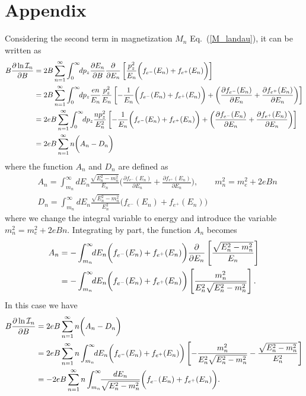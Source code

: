 \documentclass[sn-mathphys,Numbered]{sn-jnl}
\begin{document}
\section{Appendix}
\label{Append}
Considering the second term in magnetization $M_n$ Eq.~(\ref{M_landau}), it can be written as
\begin{align}
B\frac{\partial\ln\mathcal{I}_n}{\partial B}&=2B \sum_{n=1}^\infty\int_0^\infty\!\!dp_z \frac{\partial E_n}{\partial B}\frac{\partial}{\partial E_n}\left[\frac{p_z^2}{E_{n}}\bigg(f_{e^-}(E_n)+f_{e^+}(E_n)\bigg)\right]\notag\\
&=2B \sum_{n=1}^\infty\int_0^\infty\!\!dp_z \frac{en}{E_n}\frac{p_z^2}{E_{n}}\left[-\frac{1}{E_{n}}\bigg(f_{e^-}(E_n)+f_{e^+}(E_n)\bigg)+\bigg(\frac{\partial f_{e^-}(E_n)}{\partial E_n}+\frac{\partial f_{e^+}(E_n)}{\partial E_n}\bigg)\right]\notag\\
&=2eB \sum_{n=1}^\infty\int_0^\infty\!\!dp_z \frac{n p_z^2}{E^2_{n}}\left[-\frac{1}{E_{n}}\bigg(f_{e^-}(E_n)+f_{e^+}(E_n)\bigg)+\bigg(\frac{\partial f_{e^-}(E_n)}{\partial E_n}+\frac{\partial f_{e^+}(E_n)}{\partial E_n}\bigg)\right]\notag\\
&=2eB\sum_{n=1}^\infty n\bigg(A_n-D_n\bigg)
\end{align}
where the function $A_n$ and $D_n$ are defined as
\begin{align}
\label{Function_A}
&A_n=\int_{m_n}^\infty\!\!dE_n \frac{\sqrt{E^2_n-m^2_n}}{E_{n}}\bigg(\frac{\partial f_{e^-}(E_n)}{\partial E_n}+\frac{\partial f_{e^+}(E_n)}{\partial E_n}\bigg),\qquad m_n^2=m^2_e+2eBn\\ 
\label{Function_D}
&D_n=\int_{m_n}^\infty\!\!dE_n \frac{\sqrt{E^2_n-m^2_n}}{E^2_{n}}\bigg(f_{e^-}(E_n)+f_{e^+}(E_n)\bigg)
\end{align}
where we change the integral variable to energy and introduce the variable $m_n^2=m^2_e+2eBn$. Integrating by part, the function $A_n$ becomes
\begin{align}
A_n&=-\int_{m_n}^\infty\!\!dE_n \bigg(f_{e^-}(E_n)+f_{e^+}(E_n)\bigg)\frac{\partial}{\partial E_n}\left[\frac{\sqrt{E^2_n-m^2_n}}{E_{n}}\right]\notag\\
&=-\int_{m_n}^\infty\!\!dE_n \bigg(f_{e^-}(E_n)+f_{e^+}(E_n)\bigg)\left[\frac{m^2_n}{E^2_{n}\sqrt{E^2_n-m^2_n}}\right].
\end{align}
In this case we have
\begin{align}
B\frac{\partial\ln\mathcal{I}_n}{\partial B}&=2eB\sum_{n=1}^\infty n\bigg(A_n-D_n\bigg)\notag\\
&=2eB\sum_{n=1}^\infty n\int_{m_n}^\infty\!\!dE_n \bigg(f_{e^-}(E_n)+f_{e^+}(E_n)\bigg)\left[-\frac{m^2_n}{E^2_{n}\sqrt{E^2_n-m^2_n}}-\frac{\sqrt{E^2_n-m^2_n}}{E^2_{n}}\right]\notag\\
&=-2eB\sum_{n=1}^\infty n\int_{m_n}^\infty\!\!\frac{dE_n}{\sqrt{E^2_n-m^2_n}} \bigg(f_{e^-}(E_n)+f_{e^+}(E_n)\bigg).
\end{align}
\end{document}
